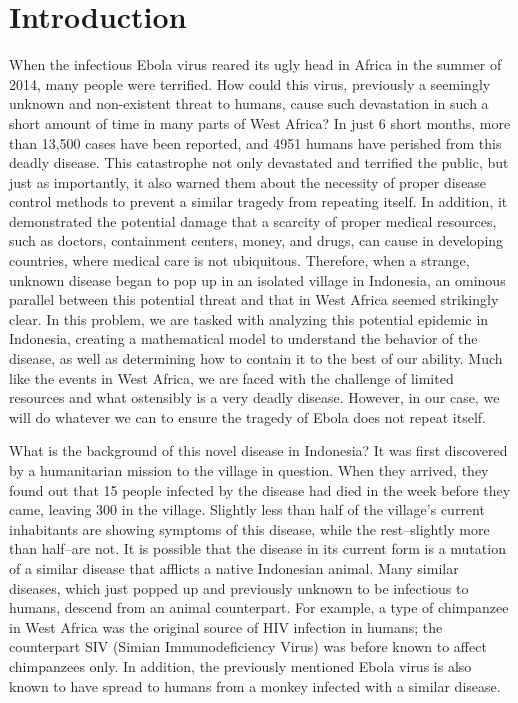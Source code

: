 \documentclass[12pt]{article}
\begin{document}
\section{Introduction}
When the infectious Ebola virus reared its ugly head in Africa in the summer of 2014, many people were terrified. How could this virus, previously a seemingly unknown and non-existent threat to humans, cause such devastation in such a short amount of time in many parts of West Africa? In just 6 short months, more than 13,500 cases have been reported, and 4951 humans have perished from this deadly disease. This catastrophe not only devastated and terrified the public, but just as importantly, it also warned them about the necessity of proper disease control methods to prevent a similar tragedy from repeating itself. In addition, it demonstrated the potential damage that a scarcity of proper medical resources, such as doctors, containment centers, money, and drugs, can cause in developing countries, where medical care is not ubiquitous. Therefore, when a strange, unknown disease began to pop up in an isolated village in Indonesia, an ominous parallel between this potential threat and that in West Africa seemed strikingly clear. In this problem, we are tasked with analyzing this potential epidemic in Indonesia, creating a mathematical model to understand the behavior of the disease, as well as determining how to contain it to the best of our ability. Much like the events in West Africa, we are faced with the challenge of limited resources and what ostensibly is a very deadly disease. However, in our case, we will do whatever we can to ensure the tragedy of Ebola does not repeat itself.

What is the background of this novel disease in Indonesia? It was first discovered by a humanitarian mission to the village in question. When they arrived, they found out that 15 people infected by the disease had died in the week before they came, leaving 300 in the village. Slightly less than half of the village’s current inhabitants are showing symptoms of this disease, while the rest--slightly more than half--are not. It is possible that the disease in its current form is a mutation of a similar disease that afflicts a native Indonesian animal. Many similar diseases, which just popped up and previously unknown to be infectious to humans, descend from an animal counterpart. For example, a type of chimpanzee in West Africa was the original source of HIV infection in humans; the counterpart SIV (Simian Immunodeficiency Virus) was before known to affect chimpanzees only. In addition, the previously mentioned Ebola virus is also known to have spread to humans from a monkey infected with a similar disease.
\end{document}
